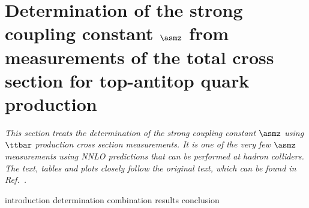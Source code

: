 \section{Determination of the strong coupling constant \texorpdfstring{$\asmz$}{alpha_s(mZ)} from measurements of the total cross section for top-antitop quark production}

\emph{%
This section treats the determination of the strong coupling constant $\asmz$ using $\ttbar$ production cross section measurements.
% 
It is one of the very few $\asmz$ measurements using NNLO predictions that can be performed at hadron colliders.
% 
The text, tables and plots closely follow the original text, which can be found in Ref.~\cite{Klijnsma:2017eqp}.
}

{introduction}
{determination}
{combination}
{results}
{conclusion}


